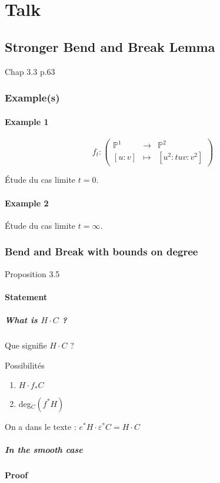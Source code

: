 \chapter{Talk}
\section{Stronger Bend and Break Lemma}
Chap 3.3
p.63
\subsection{Example(s)}
\subsubsection{Example 1}
\[
f_t : \left(
\begin{array}{ccc}
\mathbb{P}^1 & \longrightarrow & \mathbb{P}^2 \\  {}
 [ u : v ] & \mapsto &  [ u^2 : tuv : v^2 ]
\end{array} 
\right)
\]

Étude du cas limite $t=0$.
\subsubsection{Example 2}
Étude du cas limite $t=\infty$.
\subsection{Bend and Break 
with bounds on degree}
Proposition 3.5
\subsubsection{Statement}
\paragraph*{What is $H \cdot C$ ?}
Que signifie $H \cdot C$ ?

Possibilités
\begin{enumerate}
\item $H \cdot f_* C $
\item deg$_C(f^* H)$
\end{enumerate}

On a dans le texte :
$e^*H \cdot \varepsilon^*C = H \cdot C$
\paragraph*{In the smooth case}
\subsubsection{Proof}

